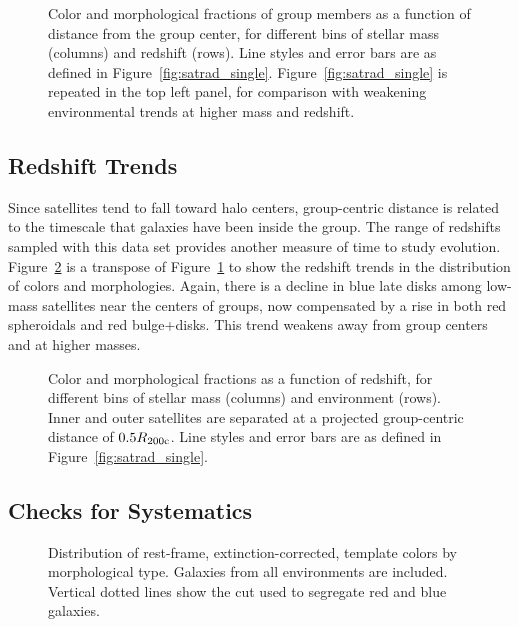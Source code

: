 \documentclass[12pt]{emulateapj}
\begin{document}
\begin{figure}[htb]
\caption{Color and morphological fractions of group members as a
  function of distance from the group center, for different bins of
  stellar mass (columns) and redshift (rows). Line styles and error
  bars are as defined in
  Figure~\ref{fig:satrad_single}. Figure~\ref{fig:satrad_single} is
  repeated in the top left panel, for comparison with weakening
  environmental trends at higher mass and redshift.}
\label{fig:satrad}
\end{figure}

\subsection{Redshift Trends}
\label{s:ztrends}

Since satellites tend to fall toward halo centers, group-centric
distance is related to the timescale that galaxies have been inside
the group. The range of redshifts sampled with this data set provides
another measure of time to study evolution. Figure~\ref{fig:satz} is a
transpose of Figure~\ref{fig:satrad} to show the redshift trends in
the distribution of colors and morphologies. Again, there is a decline
in blue late disks among low-mass satellites near the centers of
groups, now compensated by a rise in both red spheroidals and red
bulge+disks. This trend weakens away from group centers and at
higher masses.

\begin{figure}[htb]
\caption{Color and morphological fractions as a function of redshift,
  for different bins of stellar mass (columns) and environment
  (rows). Inner and outer satellites are separated at a projected
  group-centric distance of $0.5 R_{\rm 200c}$. Line styles and error
  bars are as defined in Figure~\ref{fig:satrad_single}.}
\label{fig:satz}
\end{figure}

\subsection{Checks for Systematics}
\label{s:systematics}

\begin{figure}[htb]
\caption{Distribution of rest-frame, extinction-corrected, template
  colors by morphological type. Galaxies from all environments are
  included. Vertical dotted lines show the cut used to segregate red
  and blue galaxies.}
\label{fig:color_hist}
\end{figure}
 
\end{document}
